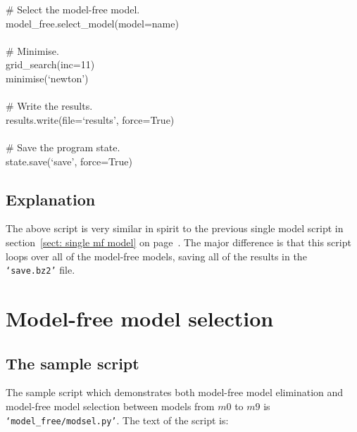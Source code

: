\begin{htmlonly}
\begin{htmlonly}
\begin{exampleenv}
\hspace*{4ex} \# Select the model-free model. \\
\hspace*{4ex} model\_free.select\_model(model=name) \\
 \\
\hspace*{4ex} \# Minimise. \\
\hspace*{4ex} grid\_search(inc=11) \\
\hspace*{4ex} minimise(`newton') \\
 \\
\hspace*{4ex} \# Write the results. \\
\hspace*{4ex} results.write(file=`results', force=True) \\
 \\
\# Save the program state. \\
state.save(`save', force=True)
\end{exampleenv}



\subsection{Explanation}

The above script is very similar in spirit to the previous single model script in section~\ref{sect: single mf model} on page~\pageref{sect: single mf model}.  The major difference is that this script loops over all of the model-free models, saving all of the results in the \texttt{`save.bz2'} file.




\section{Model-free model selection}



\subsection{The sample script}

The sample script which demonstrates both model-free model elimination and model-free model selection between models from $m0$ to $m9$ is \texttt{`model\_free/modsel.py'}.  The text of the script is:


\end{htmlonly}
\end{htmlonly}
